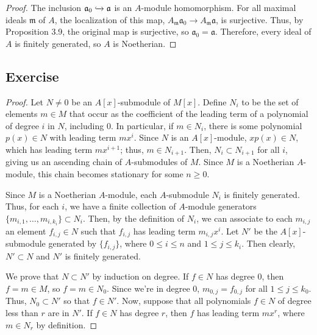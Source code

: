 \begin{proof}
The inclusion $\mathfrak{a}_0 \xhookrightarrow{} \mathfrak{a}$ is an $A$-module homomorphism. For all maximal ideals $\mathfrak{m}$ of $A$, the localization
of this map, $A_{\mathfrak{m}}\mathfrak{a}_0 \to A_{\mathfrak{m}}\mathfrak{a}$, is surjective. Thus, by Proposition 3.9, the original map is surjective,
so $\mathfrak{a}_0 = \mathfrak{a}$. Therefore, every ideal of $A$ is finitely generated, so $A$ is Noetherian.
\end{proof}

\subsection{Exercise}\label{7.10}

\begin{proof}
Let $N \neq 0$ be an $A[x]$-submodule of $M[x]$.
Define $N_i$ to be the set of elements $m \in M$ that occur as the coefficient of the leading term of a polynomial of degree $i$ in $N$,
including $0$. In particular, if $m \in N_i$, there is some polynomial $p(x) \in N$ with leading term $m x^i$. Since $N$ is an $A[x]$-module,
$x p(x) \in N$, which has leading term $m x^{i+1}$; thus, $m \in N_{i+1}$. Then, $N_i \subset N_{i+1}$ for all $i$, giving us an ascending
chain of $A$-submodules of $M$. Since $M$ is a Noetherian $A$-module, this chain becomes stationary for some $n \ge 0$.

Since $M$ is a Noetherian $A$-module, each $A$-submodule $N_i$ is finitely generated. Thus, for each $i$, we have a finite collection of 
$A$-module generators $\{m_{i,1},\ldots,m_{i,k_i}\} \subset N_i$. Then, by the definition of $N_i$, we can associate to each $m_{i,j}$
an element $f_{i,j} \in N$ such that $f_{i,j}$ has leading term $m_{i,j} x^i$. Let $N'$ be the $A[x]$-submodule generated by 
$\{f_{i,j}\}$, where $0 \le i \le n$ and $1 \le j \le k_i$. Then clearly, $N' \subset N$ and $N'$ is finitely generated.

We prove that $N \subset N'$ by induction on degree. If $f \in N$ has degree $0$, then $f = m \in M$, so $f = m \in N_0$. Since we're in 
degree $0$, $m_{0,j} = f_{0,j}$ for all $1 \le j \le k_0$. Thus, $N_0 \subset N'$ so that $f \in N'$. Now, suppose that all polynomials 
$f \in N$ of degree less than $r$ are in $N'$. If $f \in N$ has degree $r$, then $f$ has leading term $m x^r$, where $m \in N_r$ by definition.


\end{proof}
